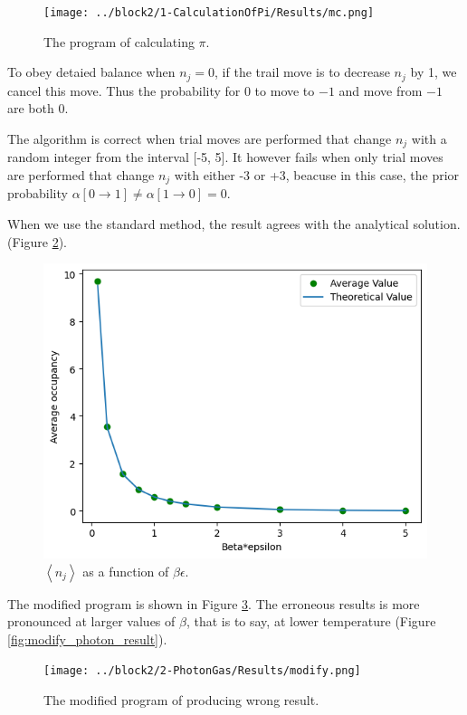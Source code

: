 \documentclass{assignmeownt}
\begin{document}
\begin{figure}
    \centering
    \texttt{[image: ../block2/1-CalculationOfPi/Results/mc.png]}
    \caption{The program of calculating $\pi$.}
    \label{fig:calculate_pi}
  \end{figure}


To obey detaied balance when $n_j=0$, if the trail move is to decrease $n_j$ by 1, we cancel this move. Thus the probability for $0$ to move to $-1$ and move from $-1$ are both $0$.

The algorithm is correct when trial moves are performed that change $n_j$ with a random integer from the interval [-5, 5]. It however fails when only trial moves are performed that change $n_j$ with either -3 or +3, beacuse in this case, the prior probability $\alpha[0\rightarrow 1]\neq\alpha[1\rightarrow 0]=0$.


When we use the standard method, the result agrees with the analytical solution. (Figure \ref{fig:energy_as_function_of_beta}).

\begin{figure}
    \centering
    \includegraphics[width=0.5\linewidth]{../block2/2-PhotonGas/Results/correct.png}
    \caption{$\left< n_j \right> $ as a function of $\beta \epsilon$.}
    \label{fig:energy_as_function_of_beta}
  \end{figure}

The modified program is shown in Figure \ref{fig:modify_photon}. The erroneous results is more pronounced at larger values of $\beta$, that is to say, at lower temperature (Figure \ref{fig:modify_photon_result}).
\begin{figure}
    \centering
    \texttt{[image: ../block2/2-PhotonGas/Results/modify.png]}
    \caption{The modified program of producing wrong result.}
    \label{fig:modify_photon}
\end{figure}
\end{document}
